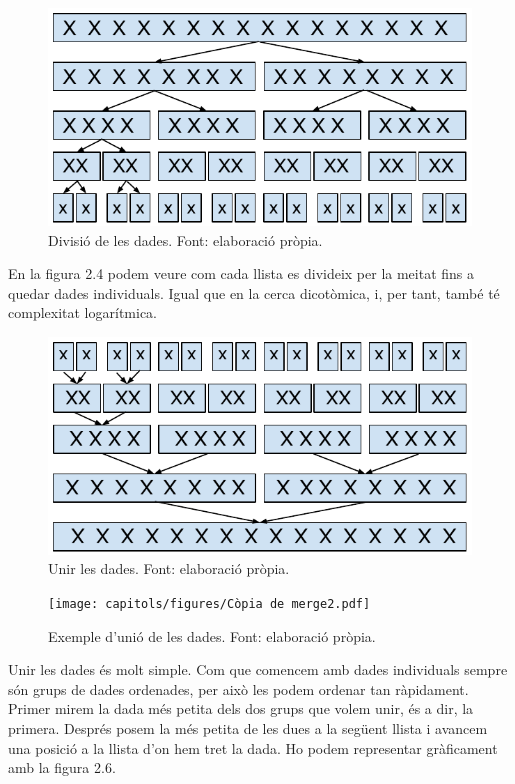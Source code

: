 \begin{figure}[H]
    \centering
    \includegraphics[width=.6\textwidth]{capitols/figures/merge.pdf}
    \caption[Divisió de les dades.]{Divisió de les dades. Font: elaboració pròpia.}
    \label{fig:my_label}
\end{figure}
\vspace{-.8cm}
En la figura 2.4 podem veure com cada llista es divideix per la meitat fins a quedar dades individuals. Igual que en la cerca dicotòmica, i, per tant, també té complexitat logarítmica.
\begin{figure}[H]
    \centering
    \includegraphics[width=.6\textwidth]{capitols/figures/merge2.pdf}
    \caption[Unir les dades.]{Unir les dades. Font: elaboració pròpia.}
    \label{fig:my_label}
\end{figure}
\vspace{-.5cm}
\begin{figure}
\vspace{-18pt}
    \centering
    \texttt{[image: capitols/figures/Còpia de merge2.pdf]}
    \caption[Exemple d'unió les dades.]{Exemple d'unió de les dades. Font: elaboració pròpia.}
    \label{fig:my_label}
\end{figure}
Unir les dades és molt simple. Com que comencem amb dades individuals sempre són grups de dades ordenades, per això les podem ordenar tan ràpidament. Primer mirem la dada més petita dels dos grups que volem unir, és a dir, la primera. Després posem la més petita de les dues a la següent llista i avancem una posició a la llista d'on hem tret la dada. Ho podem representar gràficament amb la figura 2.6.

